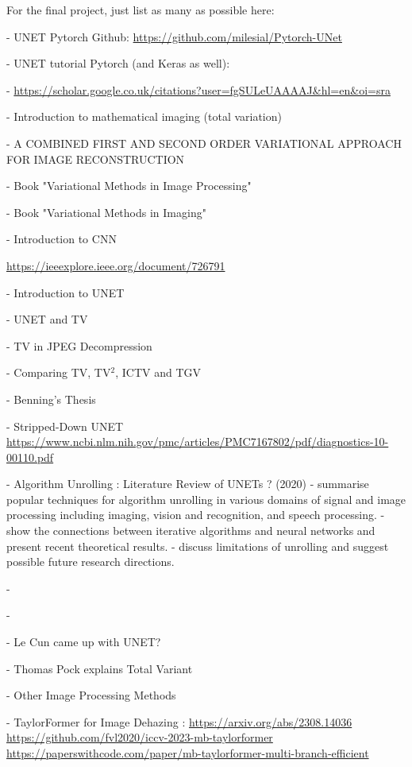 \documentclass[12pt]{article}
\begin{document}
For the final project, just list as many as possible here:

- UNET Pytorch Github: \url{https://github.com/milesial/Pytorch-UNet} \cite{unet_pytorch_github}

- UNET tutorial Pytorch (and Keras as well): \cite{unet_pyimagesearch_guide}

- \url{https://scholar.google.co.uk/citations?user=fgSULeUAAAAJ&hl=en&oi=sra}

- Introduction to mathematical imaging (total variation)\cite{papafitsoros_2015}

- A COMBINED FIRST AND SECOND ORDER VARIATIONAL APPROACH FOR IMAGE
RECONSTRUCTION \cite{papafitsoros_2013}

- Book "Variational Methods in Image Processing" \cite{Gilboa2018}

- Book "Variational Methods in Imaging" \cite{var_methods_imaging}

- Introduction to CNN \cite{Lecun_CNN}

  \url{https://ieeexplore.ieee.org/document/726791}

- Introduction to UNET \cite{unet}

- UNET and TV \cite{kostas_tv_unet}

- TV in JPEG Decompression \cite{jpeg_decompress}

- Comparing TV, TV$^2$, ICTV and TGV \cite{benning_et_al}

- Benning's Thesis \cite{benning_thesis}

- Stripped-Down UNET \cite{sd_unet} \url{https://www.ncbi.nlm.nih.gov/pmc/articles/PMC7167802/pdf/diagnostics-10-00110.pdf}

- Algorithm Unrolling : Literature Review of UNETs ? (2020) \cite{algo_unrolling}
    - summarise popular techniques for algorithm unrolling in various domains of signal and image processing including imaging, vision and recognition, and speech processing. 
    - show the connections between iterative algorithms and neural networks and present recent theoretical results. 
    - discuss limitations of unrolling and suggest possible future research directions.

- \cite{Guo_2019}

- \cite{nn_inverse_problems}

- Le Cun came up with UNET? \cite{fast_approx_sparse_coding}

- Thomas Pock explains Total Variant \cite{thomas_pock_TV}

- Other Image Processing Methods

    - \cite{taylor_former} TaylorFormer for Image Dehazing : \url{https://arxiv.org/abs/2308.14036} \url{https://github.com/fvl2020/iccv-2023-mb-taylorformer} \url{https://paperswithcode.com/paper/mb-taylorformer-multi-branch-efficient}

\printbibliography
\end{document}
